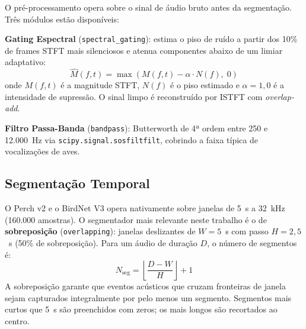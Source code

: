 \documentclass[12pt]{article}
\begin{document}
O pré-processamento opera sobre o sinal de áudio bruto antes da segmentação.
Três módulos estão disponíveis:


\textbf{Gating Espectral} (\texttt{spectral\_gating}): estima o piso de
ruído a partir dos 10\% de frames STFT mais silenciosos e atenua componentes
abaixo de um limiar adaptativo:
\begin{equation}
  \hat{M}(f,t) = \max\!\left(M(f,t) - \alpha \cdot N(f),\; 0\right)
  \label{eq:sg}
\end{equation}
onde $M(f,t)$ é a magnitude STFT, $N(f)$ é o piso estimado e
$\alpha=1{,}0$ é a intensidade de supressão. O sinal limpo é reconstruído
por ISTFT com \textit{overlap-add}.

\textbf{Filtro Passa-Banda} (\texttt{bandpass}): Butterworth de 4ª ordem
entre 250 e 12.000~Hz via \texttt{scipy.signal.sosfiltfilt}, cobrindo a
faixa típica de vocalizações de aves.

\subsection{Segmentação Temporal}

O Perch v2 e o BirdNet V3 opera nativamente sobre janelas de 5~s a 32~kHz (160.000 amostras).
O segmentador mais relevante neste trabalho é o de \textbf{sobreposição}
(\texttt{overlapping}): janelas deslizantes de $W=5$~s com passo $H=2{,}5$~s
(50\% de sobreposição). Para um áudio de duração $D$, o número de segmentos é:
\begin{equation}
  N_{\text{seg}} = \left\lfloor \frac{D - W}{H} \right\rfloor + 1
  \label{eq:nseg}
\end{equation}
A sobreposição garante que eventos acústicos que cruzam fronteiras de janela
sejam capturados integralmente por pelo menos um segmento. Segmentos mais
curtos que 5~s são preenchidos com zeros; os mais longos são recortados ao centro.


\end{document}
